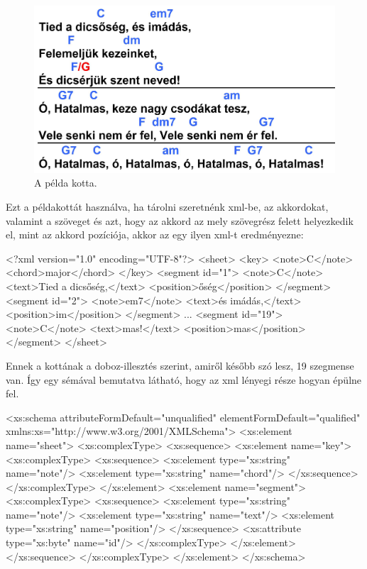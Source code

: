 \newpage
{}
\begin{figure}[h]
	\includegraphics[scale=0.3]{images/samples/Tied_a_dicsoseg.jpg}
	\caption{A példa kotta.}
	\label{fig:song1}
\end{figure}

Ezt a példakottát használva, ha tárolni szeretnénk xml-be, az akkordokat, valamint a szöveget és azt, hogy az akkord az mely szövegrész felett helyezkedik el, mint az akkord pozíciója, akkor az egy ilyen xml-t eredményezne:

\begin{xml}
<?xml version="1.0" encoding="UTF-8"?>
<sheet>
   <key>
      <note>C</note>
      <chord>major</chord>
   </key>
   <segment id="1">
      <note>C</note>
      <text>Tied a dicsőség,</text>
      <position>őség</position>
   </segment>
   <segment id="2">
      <note>em7</note>
      <text>és imádás,\n</text>
      <position>im</position>
   </segment>
   ...
   <segment id="19">
      <note>C</note>
      <text>mas!</text>
      <position>mas</position>
   </segment>
</sheet>
\end{xml}

Ennek a kottának a doboz-illesztés szerint, amiről később szó lesz, 19 szegmense van. Így egy sémával bemutatva látható, hogy az xml lényegi része hogyan épülne fel.

\begin{xml}
<xs:schema attributeFormDefault="unqualified" elementFormDefault="qualified" xmlns:xs="http://www.w3.org/2001/XMLSchema">
  <xs:element name="sheet">
    <xs:complexType>
      <xs:sequence>
        <xs:element name="key">
          <xs:complexType>
            <xs:sequence>
              <xs:element type="xs:string" name="note"/>
              <xs:element type="xs:string" name="chord"/>
            </xs:sequence>
          </xs:complexType>
        </xs:element>
        <xs:element name="segment">
          <xs:complexType>
            <xs:sequence>
              <xs:element type="xs:string" name="note"/>
              <xs:element type="xs:string" name="text"/>
              <xs:element type="xs:string" name="position"/>
            </xs:sequence>
            <xs:attribute type="xs:byte" name="id"/>
          </xs:complexType>
        </xs:element>
      </xs:sequence>
    </xs:complexType>
  </xs:element>
</xs:schema>
\end{xml}

